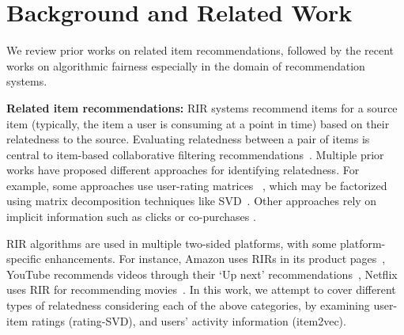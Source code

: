 \vspace{-2mm}
\section{Background and Related Work}
We review prior works on related item recommendations, 
followed by %
the recent works on algorithmic fairness %
especially in the domain of recommendation systems.

\vspace{1mm}
\noindent \textbf{Related item recommendations:} 
RIR systems recommend items %
for a source item 
(typically, the item a user is consuming at a point in time) based on their relatedness to the source.
Evaluating relatedness between a pair of items is central to item-based collaborative filtering recommendations~\cite{desrosiers2011comprehensive,linden2003amazon}. 
Multiple prior works have proposed different approaches for identifying relatedness. 
For example, some approaches use user-rating matrices
~\cite{desrosiers2011comprehensive,sarwar2001item}, which may be factorized using matrix decomposition techniques like SVD~\cite{sarwar2000application}. 
Other approaches rely on implicit %
information such as clicks or co-purchases %
\cite{barkan2016item2vec,hu2008collaborative}. 

RIR algorithms are used in %
multiple two-sided platforms, with some platform-specific enhancements. %
For instance, Amazon uses RIRs in %
its product pages~\cite{linden2003amazon,smith2017two}, 
YouTube recommends videos through their `Up next' recommendations~\cite{covington2016deep}, 
Netflix uses RIR for recommending movies~\cite{gomez2016netflix}. %
In this work, we attempt to cover different types of relatedness %
considering each of the above categories, by examining %
user-item ratings (rating-SVD), and users' activity information (item2vec). %

